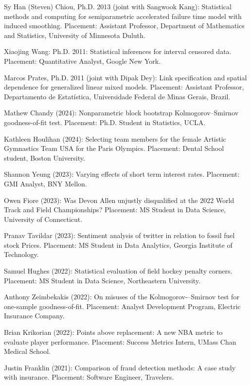 \documentclass[Statistics]{vita}
\begin{document}
\begin{vita}
\begin{Students}
\begin{Ph.D.}
    \item Sy Han (Steven) Chiou, Ph.D. 2013 (joint with Sangwook Kang): Statistical methods and computing for semiparametric accelerated failure time model with induced smoothing. Placement: Assistant Professor, Department of Mathematics and Statistics, University of Minnesota Duluth.
    \item Xiaojing Wang: Ph.D. 2011: Statistical inferences for interval censored data. Placement: Quantitative Analyst, Google New York.
    \item Marcos Prates, Ph.D. 2011 (joint with Dipak Dey): Link specification and spatial dependence for generalized linear mixed models. Placement: Assistant Professor, Departamento de Estat\'{i}stica, Universidade Federal de Minas Gerais, Brazil.
    \end{Ph.D.}
    \begin{UndergraduateHonor}
    \item Mathew Chandy (2024): Nonparametric block bootstrap Kolmogorov--Smirnov goodness-of-fit test. Placement: Ph.D. Student in Statistics, UCLA.
    \item Kathleen Houlihan (2024): Selecting team members for the female Artistic Gymnastics Team USA for the Paris Olympics. Placement: Dental School student, Boston University.
    \item Shannon Yeung (2023): Varying effects of short term interest rates. Placement: GMI Analyst, BNY Mellon.
    \item Owen Fiore (2023): Was Devon Allen unjustly disqualified at the 2022 World Track and Field Championships? Placement: MS Student in Data Science, University of Connecticut.
    \item Pranav Tavildar (2023): Sentiment analysis of twitter in relation to fossil fuel stock Prices. Placement: MS Student in Data Analytics, Georgia Institute of Technology.
    \item Samuel Hughes (2022): Statistical evaluation of field hockey penalty corners. Placement: MS Student in Data Science, Northeastern University.
    \item Anthony Zeimbekakis (2022): On misuses of the Kolmogorov-–Smirnov test for one-sample goodness-of-fit. Placement: Analyst Development Program, Electric Insurance Company.
    \item Brian Krikorian (2022): Points above replacement: A new NBA metric to evaluate player performance. Placement: Success Metrics Intern, UMass Chan Medical School.
    \item Justin Franklin (2021): Comparison of fraud detection methods: A case study with insurance. Placement: Software Engineer, Travelers.

\end{UndergraduateHonor}
\end{Students}
\end{vita}
\end{document}
